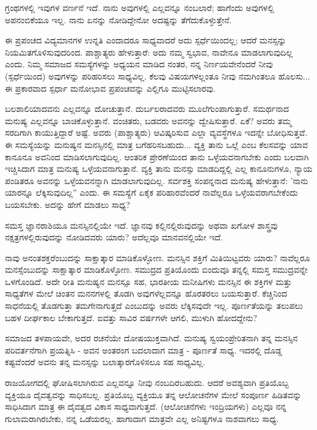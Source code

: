 ಗ್ರಂಥಗಳಲ್ಲಿ ಇವುಗಳ ವರ್ಣನೆ ಇದೆ. ನಾನು ಅವುಗಳಲ್ಲಿ ಎಲ್ಲವನ್ನೂ ನಂಬಲಾರೆ; ಹಾಗೆಂದು ಅವುಗಳಲ್ಲಿ ಅಪನಂಬಿಕೆಯೂ ಇಲ್ಲ. ನಾನು ಏನನ್ನು ನೋಡಿದ್ದೇನೋ ಅದಷ್ಟನ್ನು ತೆಗೆದುಕೊಳ್ಳುತ್ತೇನೆ.

ಈ ಪ್ರಪಂಚದ ವಿದ್ಯಮಾನಗಳ ಉನ್ನತಿ ಎಂದಾದರೂ ಸಾಧ್ಯವಾದರೆ ಅದು ಸ್ಪರ್ಧೆಯಿಂದಲ್ಲ; ಆದರೆ ಮನಸ್ಸನ್ನು ನಿಯಮಿತಗೊಳಿಸುವುದರಿಂದ. ಪಾಶ್ಚಾತ್ಯರು ಹೇಳುತ್ತಾರೆ: ಅದು ನಮ್ಮ ಸ್ವಭಾವ, ನಾವೇನೂ ಮಾಡಲಾಗುವುದಿಲ್ಲ ಎಂದು. ನಿಮ್ಮ ಸಮಾಜದ ಸಮಸ್ಯೆಗಳನ್ನು ಅಧ್ಯಯನ ಮಾಡಿದ ನಂತರ, ನನ್ನ ನಿರ್ಣಯವೇನೆಂದರೆ ನೀವು (ಸ್ಪರ್ಧೆಯಿಂದ) ಅವುಗಳನ್ನು ಪರಿಹರಿಸಲು ಸಾಧ್ಯವಿಲ್ಲ. ಕೆಲವು ವಿಷಯಗಳಲ್ಲಂತೂ ನೀವು ನಮಗಿಂತಲೂ ಹೊಲಸು... ಈ ಪ್ರಕಾರವಾದ ಸ್ಪರ್ಧಾ ಮನೋಭಾವ ಪ್ರಪಂಚವನ್ನು ಎಲ್ಲಿಗೂ ಮುಟ್ಟಿಸಲಾರವು.

ಬಲಶಾಲಿಯಾದವನು ಎಲ್ಲವನ್ನೂ ದೋಚುತ್ತಾನೆ. ದುರ್ಬಲರಾದವರು ಮೂಲೆಗುಂಪಾಗುತ್ತಾರೆ. ಸಮರ್ಥನಾದ ಮನುಷ್ಯ ಎಲ್ಲವನ್ನೂ ಬಾಚಿಕೊಳ್ಳುತ್ತಾನೆ. ವಂಚಿತರು, ಬಡವರು ಅವನನ್ನು ದ್ವೇಷಿಸುತ್ತಾರೆ. ಏಕೆ? ಅವರು ತಮ್ಮ ಸರದಿಗಾಗಿ ಕಾಯುತ್ತಿದ್ದಾರೆ ಅಷ್ಟೆ. ಅವರು (ಪಾಶ್ಚಾತ್ಯರು) ಆವಿಷ್ಕರಿಸುವ ಎಲ್ಲಾ ವ್ಯವಸ್ಥೆಗಳೂ ಇದನ್ನೇ ಬೋಧಿಸುತ್ತವೆ. ಈ ಸಮಸ್ಯೆಯನ್ನು ಮನುಷ್ಯನ ಮನಸ್ಸಿನಲ್ಲಿ ಮಾತ್ರ ಬಗೆಹರಿಸಬಹುದು... ವ್ಯಕ್ತಿ ತಾನು ಒಲ್ಲೆ ಎಂಬ ಕೆಲಸವನ್ನು ಯಾವ ಕಾನೂನೂ ಅವನಿಂದ ಮಾಡಿಸಲಾಗುವುದಿಲ್ಲ. ಆಂತರಿಕ ಪ್ರೇರಣೆಯಿಂದ ತಾನು ಒಳ್ಳೆಯವನಾಗಬೇಕು ಎಂದು ಬಲವಾಗಿ ಇಚ್ಚಿಸಿದಾಗ ಮಾತ್ರ ಮನುಷ್ಯ ಒಳ್ಳೆಯವನಾಗುತ್ತಾನೆ. ವ್ಯಕ್ತಿ ತಾನು ಮನಸ್ಸು ಮಾಡದಿದ್ದಲ್ಲಿ ಎಲ್ಲ ಕಾನೂನುಗಳೂ, ನ್ಯಾಯ ಪಂಡಿತರೂ ಅವನನ್ನು ಒಳ್ಳೆಯವನನ್ನಾಗಿ ಮಾಡಲಾಗುವುದಿಲ್ಲ. ಸರ್ವಶಕ್ತಿ ಸಂಪನ್ನನಾದ ಮನುಷ್ಯ ಹೇಳುತ್ತಾನೆ: 'ನಾನು ಯಾರನ್ನೂ ಲೆಕ್ಕಿಸುವುದಿಲ್ಲ” ಎಂದು. ಈ ಸಮಸ್ಯೆಗೆ ಏಕೈಕ ಪರಿಹಾರವೆಂದರೆ ನಾವೆಲ್ಲರೂ ಒಳ್ಳೆಯವರಾಗಬೇಕೆಂದು ಬಯಸಬೇಕು. ಅದನ್ನು ಹೇಗೆ ಮಾಡಲು ಸಾಧ್ಯ?

ಸಮಸ್ತ ಜ್ಞಾನರಾಶಿಯೂ ಮನಸ್ಸಿನಲ್ಲಿಯೇ ಇದೆ. ಜ್ಞಾನವು ಕಲ್ಲಿನಲ್ಲಿರುವುದನ್ನು ಅಥವಾ ಖಗೋಳ ಶಾಸ್ತ್ರವು ನಕ್ಷತ್ರಗಳಲ್ಲಿರುವುದನ್ನು ನೋಡಿದವರು ಯಾರು? ಅದೆಲ್ಲವೂ ಮಾನವನಲ್ಲಿಯೇ ಇದೆ.

ನಾವು ಅನಂತಶಕ್ತರೆಂಬುದನ್ನು ಸಾಕ್ಷಾತ್ಕಾರ ಮಾಡಿಕೊಳ್ಳೋಣ. ಮನಸ್ಸಿನ ಶಕ್ತಿಗೆ ಮಿತಿಯಿಟ್ಟವರು ಯಾರು? ನಾವೆಲ್ಲರೂ ಮನಸ್ಸೆಂಬುದನ್ನು ಸಾಕ್ಷಾತ್ಕಾರ ಮಾಡಿಕೊಳ್ಳೋಣ. ಸಮುದ್ರದ ಪ್ರತಿಯೊಂದು ಬಿಂದುವೂ ತನ್ನಲ್ಲಿ ಸಮಸ್ತ ಸಮುದ್ರವನ್ನೇ ಒಳಗೊಂಡಿದೆ. ಅದೇ ರೀತಿ ಮನುಷ್ಯನ ಮನಸ್ಸೂ ಸಹ, ಭಾರತೀಯ ಮನೀಷಿಗಳು ಮನಸ್ಸಿನ ಈ ಶಕ್ತಿಗಳ ಮತ್ತು ಸಾಧ್ಯತೆಗಳ ಮೇಲೆ ಚಿಂತನ ಮನನಗಳಲ್ಲಿ ತೊಡಗಿ ಅವುಗಳೆಲ್ಲವನ್ನೂ ಹೊರತರಲು ಬಯಸುತ್ತಾರೆ. ಕೆಚ್ಚಿನಿಂದ ಸಾಧನೆಯಲ್ಲಿ ತೊಡಗುತ್ತಾ ತಮಗೇನಾಗುತ್ತದೆ ಎಂಬುದನ್ನು ಅವರು ಲೆಕ್ಕಿಸವುದೇ ಇಲ್ಲ. ಪೂರ್ಣತೆಯನ್ನು ತಲುಪಲು ಬಹಳ ದೀರ್ಘಕಾಲ ಬೇಕಾಗುತ್ತದೆ. ಐವತ್ತು ಸಾವಿರ ವರ್ಷಗಳೇ ಆಗಲಿ, ಮುಳುಗಿ ಹೋದದ್ದೇನು?

ಸಮಾಜದ ತಳಪಾಯವೇ, ಅದರ ರಚನೆಯೇ ದೋಷಯುಕ್ತವಾಗಿದೆ. ಮನುಷ್ಯ ಸ್ವಯಂಪ್ರೇರಿತನಾಗಿ ತನ್ನ ಮನಸ್ಸಿನ ಪರಿವರ್ತನೆಗಾಗಿ ಪ್ರಯತ್ನಿಸಿ - ಅವನ ಅಂತರಂಗ ಬದಲಾದಾಗ ಮಾತ್ರ - ಪೂರ್ಣತೆ ಸಾಧ್ಯ. ಇದರಲ್ಲಿ ದೊಡ್ಡ ಕಷ್ಟವೆಂದರೆ ಅವನು ತನ್ನ ಮನಸ್ಸನ್ನು ಬಲಾತ್ಕಾರಗೊಳಿಸಲೂ ಸಹ ಸಾಧ್ಯವಿಲ್ಲ.

ರಾಜಯೋಗದಲ್ಲಿ ಘೋಷಿಸಲಾಗಿರುವ ಎಲ್ಲವನ್ನೂ ನೀವು ನಂಬದಿರಬಹುದು. ಆದರೆ ಅವಶ್ಯವಾಗಿ ಪ್ರತಿಯೊಬ್ಬ ವ್ಯಕ್ತಿಯೂ ದೈವತ್ವವನ್ನು ಸಾಧಿಸಬಲ್ಲ. ಪ್ರತಿಯೊಬ್ಬ ವ್ಯಕ್ತಿಯೂ ತನ್ನ ಆಲೋಚನೆಗಳ ಮೇಲೆ ಸಂಪೂರ್ಣ ಹಿಡಿತವನ್ನು ಸಾಧಿಸಿದಾಗ ಮಾತ್ರ ಈ ದೈವತ್ವದ ವಿಕಾಸ ಸಾಧ್ಯವಾಗುತ್ತದೆ. (ಆಲೋಚನೆಗಳು ಇಂದ್ರಿಯಗಳು) ಎಲ್ಲವೂ ನನ್ನ ಗುಲಾಮರಾಗಿರಬೇಕು, ನನ್ನ ಒಡೆಯರಲ್ಲ. ಹಾಗಾದಾಗ ಮಾತ್ರವೇ ಎಲ್ಲ ಅನಿಷ್ಟಗಳೂ ನಾಶವಾಗಲು ಸಾಧ್ಯ.


